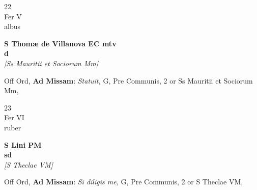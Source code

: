 \documentclass[10pt, openany]{book}
\begin{document}
        \begin{center}
            \begin{minipage}{3.5in}
                \vspace{2em}
                \begin{minipage}{0.5in}
                    {\Huge 22} \\
                    {\normalsize Fer V} \\
                    {\normalsize albus}
                \end{minipage}
                \begin{minipage}{3.0in}
                    \textbf{ \large S Thomæ de Villanova EC mtv \\
                    \textnormal{\normalsize d}} \\ \textit{[Ss Mauritii et Sociorum Mm]} \\ 
                \end{minipage}
                \begin{justify}Off Ord, \textbf{Ad Missam}: \textit{Statuit,} G, Pre Communis, 2 or Ss Mauritii et Sociorum Mm,  
                \end{justify}
            \end{minipage}
        \end{center}
    
        \begin{center}
            \begin{minipage}{3.5in}
                \vspace{2em}
                \begin{minipage}{0.5in}
                    {\Huge 23} \\
                    {\normalsize Fer VI} \\
                    {\normalsize ruber}
                \end{minipage}
                \begin{minipage}{3.0in}
                    \textbf{ \large S Lini PM \\
                    \textnormal{\normalsize sd}} \\ \textit{[S Theclae VM]} \\ 
                \end{minipage}
                \begin{justify}Off Ord, \textbf{Ad Missam}: \textit{Si diligis me,} G, Pre Communis, 2 or S Theclae VM,  
                \end{justify}
            \end{minipage}
        \end{center}
    
\end{document}
